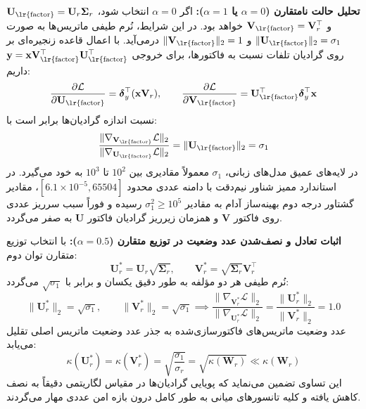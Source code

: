 \textbf{تحلیل حالت نامتقارن ($\alpha = 0$ یا $\alpha = 1$):} اگر $\alpha = 0$ انتخاب شود، $\mathbf{U}_{\text{\lr{factor}}} = \mathbf{U}_r \mathbf{\Sigma}_r$ و $\mathbf{V}_{\text{\lr{factor}}} = \mathbf{V}_r^\top$ خواهد بود. در این شرایط، نُرم طیفی ماتریس‌ها به صورت $\|\mathbf{U}_{\text{\lr{factor}}}\|_2 = \sigma_1$ و $\|\mathbf{V}_{\text{\lr{factor}}}\|_2 = 1$ درمی‌آید. با اعمال قاعده زنجیره‌ای بر روی گرادیان تلفات نسبت به فاکتورها، برای خروجی $\mathbf{y} = \mathbf{x} \mathbf{V}_{\text{\lr{factor}}}^\top \mathbf{U}_{\text{\lr{factor}}}^\top$ داریم:
\begin{equation}
\frac{\partial \mathcal{L}}{\partial \mathbf{U}_{\text{\lr{factor}}}} = \boldsymbol{\delta}_y^\top (\mathbf{x} \mathbf{V}_r), \qquad \frac{\partial \mathcal{L}}{\partial \mathbf{V}_{\text{\lr{factor}}}} = \mathbf{U}_{\text{\lr{factor}}}^\top \boldsymbol{\delta}_y^\top \mathbf{x}
\end{equation}
نسبت اندازه گرادیان‌ها برابر است با:
\begin{equation}
\frac{\|\nabla_{\mathbf{V}_{\text{\lr{factor}}}} \mathcal{L}\|_2}{\|\nabla_{\mathbf{U}_{\text{\lr{factor}}}} \mathcal{L}\|_2} = \|\mathbf{U}_{\text{\lr{factor}}}\|_2 = \sigma_1
\end{equation}
در لایه‌های عمیق مدل‌های زبانی، $\sigma_1$ معمولاً مقادیری بین $10^2$ تا $10^3$ به خود می‌گیرد. در استاندارد ممیز شناور نیم‌دقت  با دامنه عددی محدود $[6.1 \times 10^{-5}, 65504]$، مقادیر گشتاور درجه دوم بهینه‌ساز آدام  به مقادیر $\sigma_1^2 \ge 10^5$ رسیده و فوراً سبب سرریز عددی  روی فاکتور $\mathbf{V}$ و همزمان زیرریز  گرادیان فاکتور $\mathbf{U}$ به صفر می‌گردد.

\textbf{اثبات تعادل و نصف‌شدن عدد وضعیت در توزیع متقارن ($\alpha = 0.5$):} با انتخاب توزیع متقارن توان دوم:
\begin{equation}
\mathbf{U}_r^* = \mathbf{U}_r \sqrt{\mathbf{\Sigma}_r}, \qquad \mathbf{V}_r^* = \sqrt{\mathbf{\Sigma}_r} \mathbf{V}_r^\top
\end{equation}
نُرم طیفی هر دو مؤلفه به طور دقیق یکسان و برابر با $\sqrt{\sigma_1}$ می‌گردد:
\begin{equation}
\|\mathbf{U}_r^*\|_2 = \sqrt{\sigma_1}, \qquad \|\mathbf{V}_r^*\|_2 = \sqrt{\sigma_1} \implies \frac{\|\nabla_{\mathbf{V}_r^*} \mathcal{L}\|_2}{\|\nabla_{\mathbf{U}_r^*} \mathcal{L}\|_2} = \frac{\|\mathbf{U}_r^*\|_2}{\|\mathbf{V}_r^*\|_2} = 1.0
\end{equation}
عدد وضعیت  ماتریس‌های فاکتورسازی‌شده به جذر عدد وضعیت ماتریس اصلی تقلیل می‌یابد:
\begin{equation}
\kappa(\mathbf{U}_r^*) = \kappa(\mathbf{V}_r^*) = \sqrt{\frac{\sigma_1}{\sigma_r}} = \sqrt{\kappa(\mathbf{W}_r)} \ll \kappa(\mathbf{W}_r)
\end{equation}
این تساوی تضمین می‌نماید که پویایی گرادیان‌ها در مقیاس لگاریتمی دقیقاً به نصف کاهش یافته و کلیه تانسورهای میانی به طور کامل درون بازه امن عددی  مهار می‌گردند.

